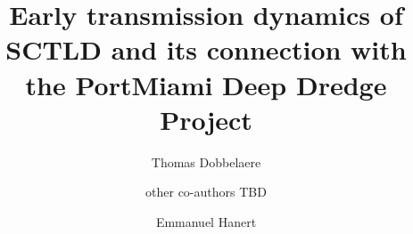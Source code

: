 \documentclass[preprint,12pt,authoryear]{elsarticle}
\begin{document}
\begin{frontmatter}



    \title{Early transmission dynamics of SCTLD and its connection with the PortMiami Deep Dredge Project}%


    \author[eli]{Thomas Dobbelaere}
    \author[]{other co-authors TBD}
    \author[eli,immc]{Emmanuel Hanert}


\end{frontmatter}
\end{document}
